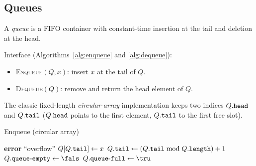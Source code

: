 \subsection{Queues}
\label{subsec:queues}

\begin{definition}[Queue]
A \emph{queue} is a FIFO container with constant-time insertion at the tail and deletion at the head.
\end{definition}


Interface (Algorithms~\ref{alg:enqueue} and \ref{alg:dequeue}):
\begin{itemize}[before={\parskip=0pt},nosep]
  \item \textsc{Enqueue}\((Q,x)\): insert \(x\) at the tail of \(Q\).
  \item \textsc{Dequeue}\((Q)\): remove and return the head element of \(Q\).
\end{itemize}

The classic fixed-length \emph{circular-array} implementation keeps two indices \(Q\mathtt{.}\mathtt{head}\) and \(Q\mathtt{.}\mathtt{tail}\) (\(Q\mathtt{.}\mathtt{head}\) points to the first element, \(Q\mathtt{.}\mathtt{tail}\) to the first free slot).  


\begin{figure}[htb]
  \centering
  \label{fig:queue}
\end{figure}

\begin{algorithm}[htb]
  \caption{Enqueue (circular array)}
  \label{alg:enqueue}
  \begin{algorithmic}[1]
        \State \textbf{error} ``overflow''
      \EndIf
      \State $Q[Q\mathtt{.}\mathtt{tail}] \gets x$
      \State $Q\mathtt{.}\mathtt{tail} \gets (Q\mathtt{.}\mathtt{tail} \bmod Q\mathtt{.}\mathtt{length}) + 1$
      \State $\attrib{Q}{queue\mbox{-}empty} \gets \fals$
        \State $\attrib{Q}{queue\mbox{-}full} \gets \tru$
      \EndIf
    \EndFunction
  \end{algorithmic}
\end{algorithm}

